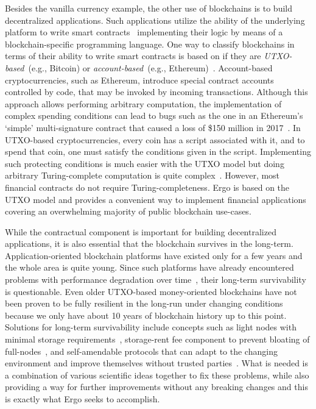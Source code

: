 Besides the vanilla currency example, the other use of blockchains is to build decentralized applications.
Such applications utilize the ability of the underlying platform to write smart contracts~\cite{szabo1994smart} implementing their logic by means of a blockchain-specific programming language.
One way to classify blockchains in terms of their ability to write smart contracts is based on if they are  
{\em UTXO-based}~(e.g., Bitcoin) or {\em account-based}~(e.g., Ethereum)~\cite{zahnentferner2018chimeric}. 
Account-based cryptocurrencies, such as Ethereum, introduce special contract accounts controlled by code,
that may be invoked by incoming transactions.
Although this approach allows performing arbitrary computation, the implementation of complex spending conditions
can lead to bugs such as the one in an Ethereum's `simple' multi-signature contract that caused a loss of \$150 million in 2017~\cite{parityLock}.
In UTXO-based cryptocurrencies, every coin has a script associated with it, and to spend that coin, one must satisfy the conditions given in the script. 
Implementing such protecting conditions is much easier with the UTXO model but doing arbitrary Turing-complete computation is quite complex~\cite{chepurnoy2018self}. However, most financial contracts do not require Turing-completeness. Ergo is based on the UTXO model and provides a convenient way to implement financial applications covering an
overwhelming majority of public blockchain use-cases.

While the contractual component is important for building decentralized applications,
it is also essential that the blockchain survives in the long-term.
Application-oriented blockchain platforms have existed only for a few years and the whole area is quite young. Since such platforms have already encountered problems with performance degradation over time~\cite{???}, their long-term survivability is questionable.
Even older UTXO-based money-oriented blockchains have not been proven to be fully resilient in the long-run
under changing conditions because we only have about 10 years of blockchain history up to this point.
Solutions for long-term survivability include concepts 
such as light nodes with minimal storage requirements~\cite{reyzin2017improving},
storage-rent fee component to prevent bloating of full-nodes~\cite{chepurnoy2018systematic}, and 
self-amendable protocols that can adapt to the changing environment and improve themselves without
trusted parties~\cite{goodman2014tezos}.
What is needed is a combination of various scientific ideas together to fix these problems, while also
providing a way for further improvements without any breaking changes and this is exactly what Ergo seeks to accomplish.


